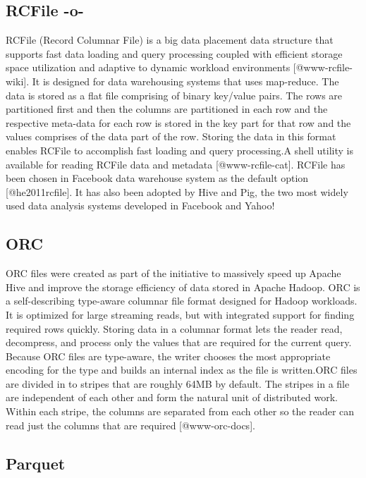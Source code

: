 \subsection{RCFile -o-}

RCFile (Record Columnar File) is a big data placement data structure
that supports fast data loading and query processing coupled with
efficient storage space utilization and adaptive to dynamic workload
environments [@www-rcfile-wiki].  It is designed for data
warehousing systems that uses map-reduce. The data is stored as a flat
file comprising of binary key/value pairs. The rows are partitioned
first and then the columns are partitioned in each row and the
respective meta-data for each row is stored in the key part for that
row and the values comprises of the data part of the row. Storing the
data in this format enables RCFile to accomplish fast loading and
query processing.A shell utility is available for reading RCFile data
and metadata [@www-rcfile-cat]. RCFile has been chosen in Facebook
data warehouse system as the default option [@he2011rcfile]. It
has also been adopted by Hive and Pig, the two most widely used data
analysis systems developed in Facebook and Yahoo!



\subsection{ORC}

ORC files were created as part of the initiative to massively speed up
Apache Hive and improve the storage efficiency of data stored in
Apache Hadoop. ORC is a self-describing type-aware columnar file
format designed for Hadoop workloads. It is optimized for large
streaming reads, but with integrated support for finding required rows
quickly. Storing data in a columnar format lets the reader read,
decompress, and process only the values that are required for the
current query. Because ORC files are type-aware, the writer chooses
the most appropriate encoding for the type and builds an internal
index as the file is written.ORC files are divided in to stripes that
are roughly 64MB by default. The stripes in a file are independent of
each other and form the natural unit of distributed work. Within each
stripe, the columns are separated from each other so the reader can
read just the columns that are required [@www-orc-docs].

     
\subsection{Parquet}


